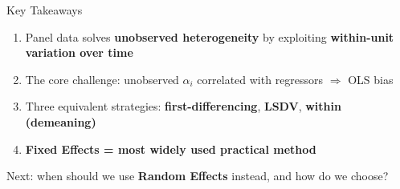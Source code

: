 \documentclass[aspectratio=169]{beamer}
\newenvironment{callout-note}[1][Note]{%
  \begin{tcolorbox}[colback=noteblue, colframe=noteframe,
    title={\textbf{#1}}, fonttitle=\small\bfseries,
    left=4pt, right=4pt, top=2pt, bottom=2pt]
}{\end{tcolorbox}}
\begin{document}
\begin{frame}{Key Takeaways}
  \begin{enumerate}
    \item Panel data solves \textbf{unobserved heterogeneity} by exploiting \textbf{within-unit variation over time}
    \item The core challenge: unobserved $\alpha_i$ correlated with regressors $\Rightarrow$ OLS bias
    \item Three equivalent strategies: \textbf{first-differencing}, \textbf{LSDV}, \textbf{within (demeaning)}
    \item \textbf{Fixed Effects = most widely used practical method}
  \end{enumerate}

  \vspace{0.5em}
  \begin{callout-note}
    Next: when should we use \textbf{Random Effects} instead, and how do we choose?
  \end{callout-note}
\end{frame}
\end{document}
